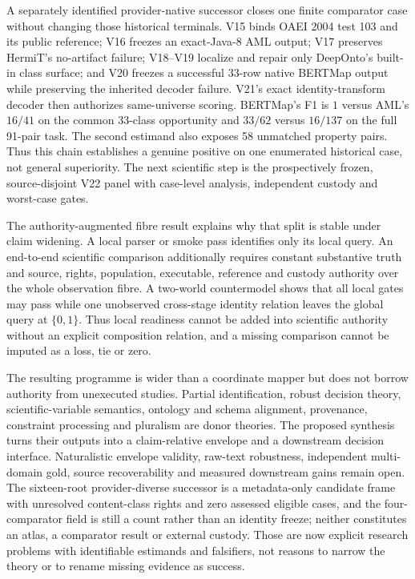 A separately identified provider-native successor closes one finite comparator
case without changing those historical terminals. V15 binds OAEI 2004 test 103
and its public reference; V16 freezes an exact-Java-8 AML output; V17 preserves
HermiT's no-artifact failure; V18--V19 localize and repair only DeepOnto's
built-in class surface; and V20 freezes a successful 33-row native BERTMap
output while preserving the inherited decoder failure. V21's exact
identity-transform decoder then authorizes same-universe scoring. BERTMap's F1
is $1$ versus AML's $16/41$ on the common 33-class opportunity and $33/62$
versus $16/137$ on the full 91-pair task. The second estimand also exposes 58
unmatched property pairs. Thus this chain establishes a genuine positive on
one enumerated historical case, not general superiority. The next scientific
step is the prospectively frozen, source-disjoint V22 panel with case-level
analysis, independent custody and worst-case gates.

The authority-augmented fibre result explains why that split is stable under
claim widening.  A local parser or smoke pass identifies only its local query.
An end-to-end scientific comparison additionally requires constant substantive
truth and source, rights, population, executable, reference and custody
authority over the whole observation fibre.  A two-world countermodel shows
that all local gates may pass while one unobserved cross-stage identity
relation leaves the global query at $\{0,1\}$.  Thus local readiness cannot be
added into scientific authority without an explicit composition relation, and
a missing comparison cannot be imputed as a loss, tie or zero.

The resulting programme is wider than a coordinate mapper but does not borrow
authority from unexecuted studies. Partial identification, robust decision
theory, scientific-variable semantics, ontology and schema alignment,
provenance, constraint processing and pluralism are donor theories. The
proposed synthesis turns their outputs into a claim-relative envelope and a
downstream decision interface. Naturalistic envelope validity, raw-text
robustness, independent multi-domain gold, source recoverability and measured
downstream gains remain open. The sixteen-root provider-diverse successor is a
metadata-only candidate frame with unresolved content-class rights and zero
assessed eligible cases, and the four-comparator field is still a count rather
than an identity freeze; neither constitutes an atlas, a comparator result or
external custody.
Those are now explicit research problems with identifiable estimands and
falsifiers, not reasons to narrow the theory or to rename missing evidence as
success.

\endinput
